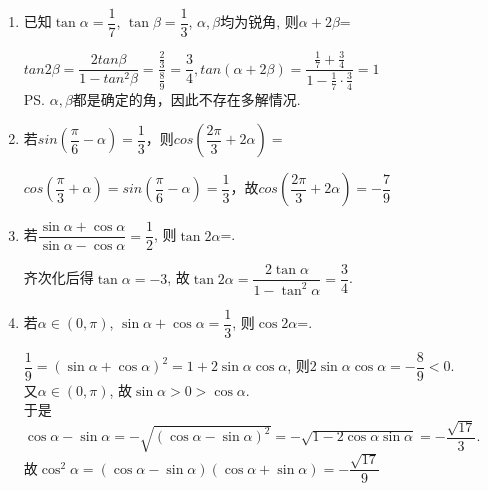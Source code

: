 \begin{enumerate}
\begin{jieda}
\begin{enumerate}
            $tan2A = \dfrac{2tanA}{1 - tan^2A} = \dfrac{\frac{3}{4}\times2}{1 - (\frac{3}{4})^2} = \dfrac{24}{7}$ \quad $tan2B = \dfrac{2tanB}{1 - tan^2B} = \dfrac{2\times2}{1 - 2^2} = -\dfrac{4}{3}$ \\
            $tan(2A+2B) = \dfrac{tan2A+tan2B}{1 - tan2A\cdot tan2B} = \dfrac{\dfrac{24}{7} - \dfrac{4}{3}}{1 - \dfrac{24}{7} \times (-\dfrac{4}{3})} = \dfrac{44}{117}$
        \end{enumerate}
    \end{jieda}
    \item 已知$\tan\alpha=\dfrac{1}{7}$, $\tan\beta=\dfrac{1}{3}$, $\alpha,\beta$均为锐角, 则$\alpha+2\beta$=
    \begin{jieda}
        $tan2\beta = \dfrac{2tan\beta}{1-tan^2\beta} = \dfrac{\frac{2}{3}}{\frac{8}{9}} = \dfrac{3}{4}, tan(\alpha + 2\beta) = \dfrac{\frac{1}{7} + \frac{3}{4}}{1 - \frac{1}{7} \cdot \frac{3}{4}} = 1$ \\
        \ps $\alpha, \beta$都是确定的角，因此不存在多解情况.
    \end{jieda}

    \item 若$sin(\dfrac{\pi}{6} - \alpha) = \dfrac{1}{3}$，则$cos(\dfrac{2\pi}{3} + 2\alpha) = $
        \begin{jieda}
            $cos(\dfrac{\pi}{3} + \alpha) = sin(\dfrac{\pi}{6} - \alpha) = \dfrac{1}{3}$，故$cos(\dfrac{2\pi}{3} + 2\alpha) = -\dfrac{7}{9}$
        \end{jieda}

    \item 若$\dfrac{\sin\alpha+\cos\alpha}{\sin\alpha-\cos\alpha}=\dfrac{1}{2}$, 则$\tan2\alpha$=. 
    \begin{jieda}
    齐次化后得$\tan\alpha=-3$, 故$\tan2\alpha=\dfrac{2\tan\alpha}{1-\tan^2\alpha}=\dfrac{3}{4}$. 
    \end{jieda}
    \item 若$\alpha\in(0,\pi)$, $\sin\alpha+\cos\alpha=\dfrac{1}{3}$, 则$\cos2\alpha$=. 
    \begin{jieda}
        $\dfrac{1}{9}=(\sin\alpha+\cos\alpha)^2=1+2\sin\alpha\cos\alpha$, 则$2\sin\alpha\cos\alpha=-\dfrac{8}{9}<0$. \\
    又$\alpha\in(0,\pi)$, 故$\sin\alpha>0>\cos\alpha$. \\
    于是$\cos\alpha-\sin\alpha=-\sqrt{(\cos\alpha-\sin\alpha)^2}=-\sqrt{1-2\cos\alpha\sin\alpha}=-\dfrac{\sqrt{17}}{3}$. \\
    故$\cos^2\alpha=(\cos\alpha-\sin\alpha)(\cos\alpha+\sin\alpha)=-\dfrac{\sqrt{17}}{9}$
    \end{jieda}
    

\end{enumerate}
